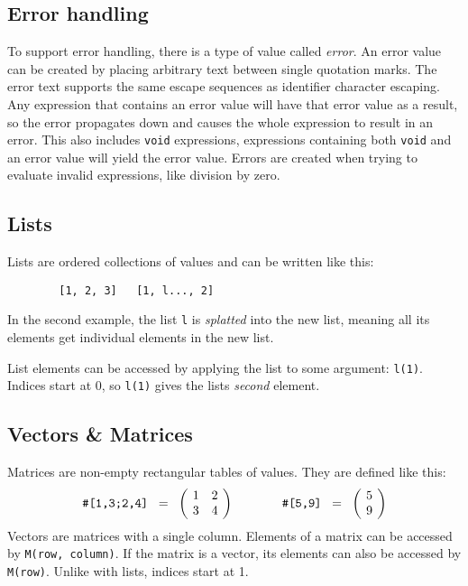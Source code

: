 \documentclass[10pt]{article}
\begin{document}
    \subsection{Error handling}\label{subsec:error-handling}
    To support error handling, there is a type of value called \textsl{error}.
    An error value can be created by placing arbitrary text between single quotation marks.
    The error text supports the same escape sequences as identifier character escaping.
    Any expression that contains an error value will have that error value as a result, so the error propagates down and causes the whole expression to result in an error.
    This also includes \verb|void| expressions, expressions containing both \verb|void| and an error value will yield the error value.
    Errors are created when trying to evaluate invalid expressions, like division by zero.
    
    \subsection{Lists}\label{subsec:lists}
    Lists are ordered collections of values and can be written like this:
    \begin{verbatim}
        [1, 2, 3]   [1, l..., 2]
    \end{verbatim}
    In the second example, the list \verb|l| is \textsl{splatted} into the new list, meaning all its elements get individual elements in the new list.
    
    List elements can be accessed by applying the list to some argument: \verb|l(1)|.
    Indices start at $ 0 $, so \verb|l(1)| gives the lists \textsl{second} element.
    
    \subsection{Vectors \& Matrices}\label{subsec:vectors-matrices}
    Matrices are non-empty rectangular tables of values.
    They are defined like this:
    \[
        \verb|#[1,3;2,4]| \;\; = \;\; \biggl(\kern-\nulldelimiterspace\begin{array}{cc}
            1 & 2 \\
            3 & 4 \\
        \end{array}\kern-\nulldelimiterspace\biggr)
        \qquad\qquad
        \verb|#[5,9]| \;\; = \;\; \biggl(\kern-\nulldelimiterspace\begin{array}{c}
            5 \\ 9
        \end{array}\kern-\nulldelimiterspace\biggr)
    \]
    Vectors are matrices with a single column.
    Elements of a matrix can be accessed by \verb|M(row, column)|.
    If the matrix is a vector, its elements can also be accessed by \verb|M(row)|.
    Unlike with lists, indices start at 1.
\end{document}
